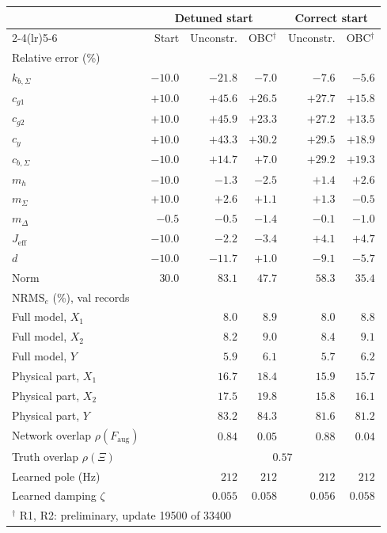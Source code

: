 \setlength{\tabcolsep}{3pt}
\begin{tabular}{l r r r r r}
\toprule
 & \multicolumn{3}{c}{Detuned start} & \multicolumn{2}{c}{Correct start}\\
\cmidrule(lr){2-4}\cmidrule(lr){5-6}
 & Start & Unconstr. & OBC$^\dagger$ & Unconstr. & OBC$^\dagger$\\
\midrule
\multicolumn{6}{l}{Relative error (\%)}\\
$k_{b,\Sigma}$ & $-10.0$ & $-21.8$ & $-7.0$ & $-7.6$ & $-5.6$\\
$c_{g1}$ & $+10.0$ & $+45.6$ & $+26.5$ & $+27.7$ & $+15.8$\\
$c_{g2}$ & $+10.0$ & $+45.9$ & $+23.3$ & $+27.2$ & $+13.5$\\
$c_y$ & $+10.0$ & $+43.3$ & $+30.2$ & $+29.5$ & $+18.9$\\
$c_{b,\Sigma}$ & $-10.0$ & $+14.7$ & $+7.0$ & $+29.2$ & $+19.3$\\
$m_h$ & $-10.0$ & $-1.3$ & $-2.5$ & $+1.4$ & $+2.6$\\
$m_\Sigma$ & $+10.0$ & $+2.6$ & $+1.1$ & $+1.3$ & $-0.5$\\
$m_\Delta$ & $-0.5$ & $-0.5$ & $-1.4$ & $-0.1$ & $-1.0$\\
$J_{\mathrm{eff}}$ & $-10.0$ & $-2.2$ & $-3.4$ & $+4.1$ & $+4.7$\\
$d$ & $-10.0$ & $-11.7$ & $+1.0$ & $-9.1$ & $-5.7$\\
Norm & $30.0$ & $83.1$ & $47.7$ & $58.3$ & $35.4$\\
\midrule
\multicolumn{6}{l}{$\mathrm{NRMS}_e$ (\%), val records}\\
Full model, $X_1$ &  & $8.0$ & $8.9$ & $8.0$ & $8.8$\\
Full model, $X_2$ &  & $8.2$ & $9.0$ & $8.4$ & $9.1$\\
Full model, $Y$ &  & $5.9$ & $6.1$ & $5.7$ & $6.2$\\
Physical part, $X_1$ &  & $16.7$ & $18.4$ & $15.9$ & $15.7$\\
Physical part, $X_2$ &  & $17.5$ & $19.8$ & $15.8$ & $16.1$\\
Physical part, $Y$ &  & $83.2$ & $84.3$ & $81.6$ & $81.2$\\
\midrule
Network overlap $\rho(F_{\mathrm{aug}})$ &  & $0.84$ & $0.05$ & $0.88$ & $0.04$\\
Truth overlap $\rho(\Xi)$ & & \multicolumn{4}{c}{$0.57$}\\
Learned pole (Hz) &  & $212$ & $212$ & $212$ & $212$\\
Learned damping $\zeta$ &  & $0.055$ & $0.058$ & $0.056$ & $0.058$\\
\bottomrule
\multicolumn{6}{l}{\footnotesize $^\dagger$ R1, R2: preliminary, update 19500 of 33400}\\
\end{tabular}
